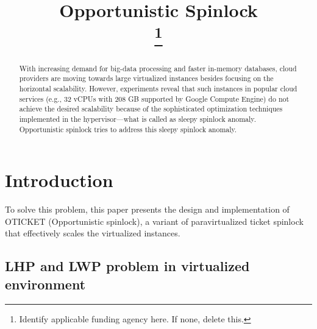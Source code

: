 \documentclass[conference]{IEEEtran}
\begin{document}
\title{Opportunistic Spinlock\\
\thanks{Identify applicable funding agency here. If none, delete this.}
}

\author{
\and
{}
}

\maketitle

\begin{abstract}
With increasing demand for big-data processing and faster in-memory
databases, cloud providers are moving towards large virtualized instances
besides focusing on the horizontal scalability.
However, experiments reveal that such instances in popular cloud services
(e.g., 32 vCPUs with 208 GB supported by Google Compute Engine) do not
achieve the desired scalability because of the sophisticated optimization
techniques implemented in the hypervisor—what is called as sleepy spinlock
anomaly. Opportunistic spinlock tries to address this sleepy spinlock anomaly.
\newline
\end{abstract}

\section{Introduction}
To solve this problem, this paper presents the design and implementation of OTICKET (Opportunistic spinlock), a variant of paravirtualized ticket spinlock that effectively scales the virtualized instances.

\subsection{LHP and LWP problem in virtualized environment
}\label{AA}
\end{document}
